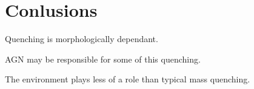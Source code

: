 \chapter{Conlusions}

Quenching is morphologically dependant. 

AGN may be responsible for some of this quenching.

The environment plays less of a role than typical mass quenching. 